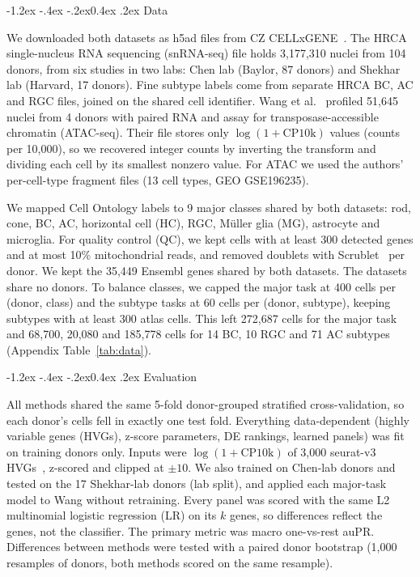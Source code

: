 \documentclass[11pt]{article}
\makeatletter
\renewcommand\subsection{\@startsection{subsection}{2}{\z@}%
    {-1.2ex \@plus -.4ex \@minus -.2ex}{0.4ex \@plus .2ex}%
    {\normalfont\normalsize\bfseries}}
\makeatother
\begin{document}
\subsection{Data}

We downloaded both datasets as h5ad files from CZ CELLxGENE~\cite{cellxgene2025}. The HRCA
single-nucleus RNA sequencing (snRNA-seq) file holds 3{,}177{,}310 nuclei from 104 donors,
from six studies in two labs: Chen lab (Baylor, 87 donors) and Shekhar lab (Harvard, 17
donors). Fine subtype labels come from separate HRCA BC, AC and RGC files, joined on the
shared cell identifier. Wang et al.~\cite{wang2022} profiled 51{,}645 nuclei from 4 donors
with paired RNA and assay for transposase-accessible chromatin (ATAC-seq). Their file stores
only $\log(1+\mathrm{CP10k})$ values (counts per 10{,}000), so we recovered integer counts
by inverting the transform and dividing each cell by its smallest nonzero value. For ATAC we
used the authors' per-cell-type fragment files (13 cell types, GEO GSE196235).

We mapped Cell Ontology labels to 9 major classes shared by both datasets: rod, cone, BC,
AC, horizontal cell (HC), RGC, M\"uller glia (MG), astrocyte and microglia. For quality
control (QC), we kept cells with at least 300 detected genes and at most 10\% mitochondrial
reads, and removed doublets with Scrublet~\cite{wolock2019} per donor. We kept the 35{,}449
Ensembl genes shared by both datasets. The datasets share no donors. To balance classes, we
capped the major task at 400 cells per (donor, class) and the subtype tasks at 60 cells per
(donor, subtype), keeping subtypes with at least 300 atlas cells. This left 272{,}687 cells
for the major task and 68{,}700, 20{,}080 and 185{,}778 cells for 14 BC, 10 RGC and 71 AC
subtypes (Appendix Table~\ref{tab:data}).

\subsection{Evaluation}

All methods shared the same 5-fold donor-grouped stratified cross-validation, so each
donor's cells fell in exactly one test fold. Everything data-dependent (highly variable
genes (HVGs), z-score parameters, DE rankings, learned panels) was fit on training donors
only. Inputs were $\log(1+\mathrm{CP10k})$ of 3{,}000 seurat-v3 HVGs~\cite{stuart2019},
z-scored and clipped at $\pm10$. We also trained on Chen-lab donors and tested on the 17
Shekhar-lab donors (lab split), and applied each major-task model to Wang without retraining.
Every panel was scored with the same L2 multinomial logistic regression (LR) on its $k$ genes,
so differences reflect the genes, not the classifier. The primary metric was macro
one-vs-rest auPR. Differences between methods were tested with a paired donor bootstrap
(1{,}000 resamples of donors, both methods scored on the same resample).
\end{document}
